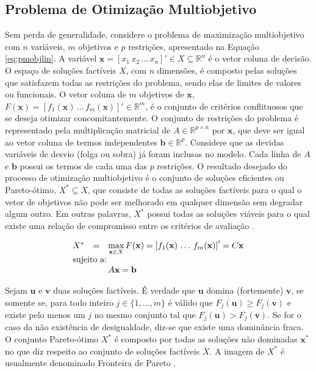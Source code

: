 \documentclass [11pt]{articleSBPO}
\begin{document}
\subsection{Problema de Otimização Multiobjetivo}

Sem perda de generalidade, considere o problema de maximização multiobjetivo com $n$ variáveis, $m$ objetivos e $p$ restrições, apresentado na Equação \ref{eq:pmobjlin}. A variável $\mathbf{x} = \left[ x_1 \, x_2 \, \ldots \, x_n \right]' \in X \subseteq \mathbb{R}^n$ é o vetor  coluna de decisão. O espaço de soluções factíveis $X$, com $n$ dimensões, é composto pelas soluções que satisfazem todas as restrições do problema, sendo elas de limites de valores ou funcionais. O vetor coluna de $m$ objetivos de $\mathbf{x}$, $F(\mathbf{x}) = \left[ f_1(\mathbf{x}) \, \ldots \, f_m(\mathbf{x}) \right]' \in \mathbb{R}^m$, é o conjunto de critérios conflituosos que se deseja otimizar concomitantemente. O conjunto de restrições do problema é representado pela multiplicação matricial de $A \in \mathbb{R}^{p \times n}$ por $\mathbf{x}$, que deve ser igual ao vetor coluna de termos independentes $\mathbf{b} \in \mathbb{R}^p$. Considere que as devidas variáveis de desvio (folga ou sobra) já foram inclusas no modelo. Cada linha de $A$ e $\mathbf{b}$ possui os termos de cada uma das $p$ restrições. O resultado desejado do processo de otimização multiobjetivo é o conjunto de soluções eficientes ou Pareto-ótimo, $X^{*} \subseteq X$, que consiste de todas as soluções factíveis para o qual o vetor de objetivos não pode ser melhorado em qualquer dimensão sem degradar algum outro. Em outras palavras, $X^{*}$ possui todas as soluções viáveis para o qual existe uma relação de compromisso entre os critérios de avaliação \cite{steuer1986multiple,takahashi2007otimizacao}.

\begin{equation}
\begin{array}{lll}
X^{*} & = & \displaystyle\max_{\mathbf{x} \in X} F(\mathbf{x}) = \left[ f_1(\mathbf{x}) \, \ldots \, f_m(\mathbf{x}) \right]' = C \mathbf{x} \\
\multicolumn{3}{l}{\mbox{sujeito a:}} \\
& & A \mathbf{x} = \mathbf{b}
\end{array}
\label{eq:pmobjlin}
\end{equation}

Sejam $\mathbf{u}$ e $\mathbf{v}$ duas soluções factíveis. É verdade que $\mathbf{u}$ domina (fortemente) $\mathbf{v}$, se somente se, para todo inteiro $j \in \{1, \ldots, m\}$ é válido que $F_j(\mathbf{u}) \ge F_j(\mathbf{v})$ e existe pelo menos um $j$ no mesmo conjunto tal que $F_j(\mathbf{u}) > F_j(\mathbf{v})$. Se for o caso da não existência de desigualdade, diz-se que existe uma dominância fraca. O conjunto Pareto-ótimo $X^{*}$ é composto por todas as soluções não dominadas $\mathbf{x}^*$ no que diz respeito ao conjunto de soluções factíveis $X$. A imagem de $X^{*}$ é usualmente denominado Fronteira de Pareto \cite{steuer1986multiple,takahashi2007otimizacao}.
\end{document}
